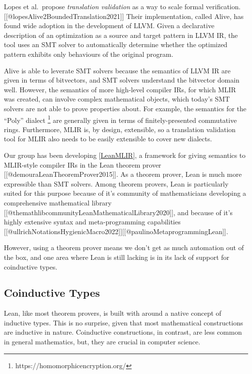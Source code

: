 Lopes et al.~propose \emph{translation validation} as a way to scale
formal verification. {[}{[}@lopesAlive2BoundedTranslation2021{]}{]}
Their implementation, called Alive, has found wide adoption in the
development of LLVM. Given a declarative description of an optimization
as a source and target pattern in LLVM IR, the tool uses an SMT solver
to automatically determine whether the optimized pattern exhibits only
behaviours of the original program.

Alive is able to leverate SMT solvers because the semantics of LLVM IR
are given in terms of bitvectors, and SMT solvers understand the
bitvector domain well. However, the semantics of more high-level
compiler IRs, for which MLIR was created, can involve complex
mathematical objects, which today's SMT solvers are not able to prove
properties about. For example, the semantics for the ``Poly'' dialect
\footnote{https://homomorphicencryption.org/} are generally given in
terms of finitely-presented commutative rings. Furthermore, MLIR is, by
design, extensible, so a translation validation tool for MLIR also needs
to be easily extensible to cover new dialects.

Our group has been developing
{[}\protect\hyperlink{leanmlir}{LeanMLIR}{]}, a framework for giving
semantics to MLIR-style compiler IRs in the Lean theorem prover
{[}{[}@demouraLeanTheoremProver2015{]}{]}. As a theorem prover, Lean is
much more expressible than SMT solvers. Among theorem provers, Lean is
particularly suited for this purpose because of it's community of
mathematicians developing a comprehensive mathematical library
{[}{[}@themathlibcommunityLeanMathematicalLibrary2020{]}{]}, and because
of it's highly extensive syntax and meta-programming capabilities
{[}{[}@ullrichNotationsHygienicMacro2022{]}{]}{[}{[}@paulinoMetaprogrammingLean{]}{]}.

However, using a theorem prover means we don't get as much automation
out of the box, and one area where Lean is still lacking is in its lack
of support for coinductive types.

\hypertarget{coinductive-types}{%
\subsection{Coinductive Types}\label{coinductive-types}}

Lean, like most theorem provers, is built with around a native concept
of inductive types. This is no surprise, given that most mathematical
constructions are inductive in nature. Coinductive constructions, in
contrast, are less common in general mathematics, but, they are crucial
in computer science.

